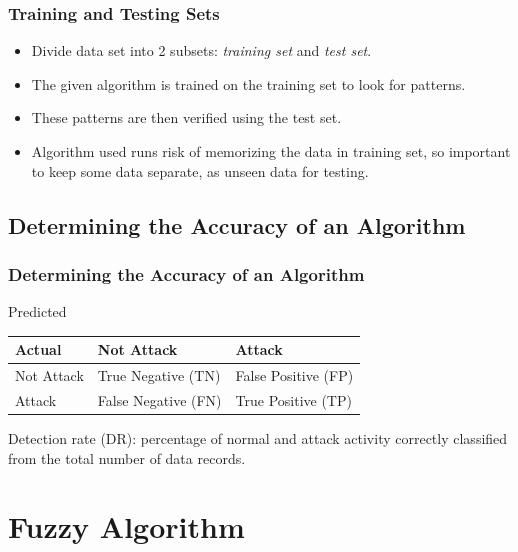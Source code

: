\documentclass{beamer}
\newcommand{\linespace}{\vskip 0.25cm}
\begin{document}
\begin{frame}
  \frametitle{Training and Testing Sets}
	\begin{itemize}
		\item Divide data set into 2 subsets: \emph{training set} and \emph{test set}.
        \item The given algorithm is trained on the training set to look for patterns.
        \item These patterns are then verified using the test set.
        \linespace
        \linespace
		\item Algorithm used runs risk of memorizing the data in training set, so important to keep some data separate, as unseen data for testing.        
	\end{itemize}
\end{frame}



\subsection{Determining the Accuracy of an Algorithm}
\begin{frame}
  \frametitle{Determining the Accuracy of an Algorithm}
\begin{table}
Predicted
\begin{tabular}{l|ll}
Actual   & Not Attack & Attack \\ \hline
Not Attack & True Negative (TN) & False Positive (FP) \\
Attack & False Negative (FN) & True Positive (TP)  \\
\end{tabular}
\end{table}
\linespace
\linespace
\begin{center}
Detection rate (DR): percentage of normal and attack activity correctly classified from the total number of data records.
\end{center}
\end{frame}
\section[Fuzzy Algorithm]{Fuzzy Algorithm}
\end{document}
